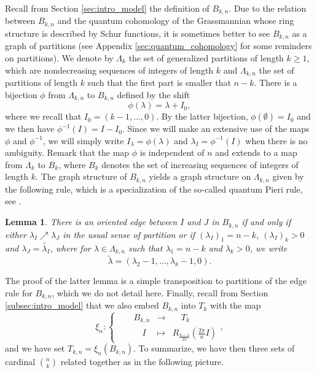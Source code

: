 \documentclass[10pt,11pt]{amsart}%
\newtheorem{lemma}[theorem]{Lemma}
\begin{document}
Recall from Section \ref{sec:intro_model} the definition of $B_{k,n}$. Due to the relation between $B_{k,n}$ and the quantum cohomology of the Grassmannian whose ring structure is described by Schur functions, it is sometimes better to see $B_{k,n}$ as a graph of partitions (see Appendix \ref{sec:quantum_cohomology} for some reminders on partitions). We denote by $\Lambda_{k}$ the set of generalized partitions of length $k\geq 1$, which are nondecreasing sequences of integers of length $k$ and $\Lambda_{k,n}$ the set of partitions of length $k$ such that the first part is smaller that $n-k$. There is a bijection $\phi$ from $\Lambda_{k,n}$ to $B_{k,n}$ defined by the shift
$$\phi(\lambda)=\lambda+I_0,$$
where we recall that $I_0=(k-1,\ldots,0)$. By the latter bijection, $\phi(\emptyset)=I_0$ and we then have $\phi^{-1}(I)=I-I_0$. Since we will make an extensive use of the maps $\phi$ and $\phi^{-1}$, we will simply write $I_{\lambda}=\phi(\lambda)$ and $\lambda_{I}=\phi^{-1}(I)$ when there is no ambiguity. Remark that the map $\phi$ is independent of $n$ and extends to a map from $\Lambda_{k}$ to $B_{k}$, where $B_{k}$ denotes the set of increasing sequences of integers of length $k$. The graph structure of $B_{k,n}$ yields a graph structure on $\Lambda_{k,n}$ given by the following rule, which is a specialization of the so-called quantum Pieri rule, see \cite{B}.
\begin{lemma}\label{lem:equivalence_graph_pieri}
There is an oriented edge between $I$ and $J$ in $B_{k,n}$ if and only if either $\lambda_{I}\nearrow \lambda_{J}$ in the usual sense of partition or if $(\lambda_{I})_1=n-k$, $(\lambda_{I})_{k}>0$ and $\lambda_{J}=\widetilde{\lambda_{I}}$, where for $\lambda\in \Lambda_{k,n}$ such that $\lambda_1=n-k$ and $\lambda_k>0$, we write 
$$\tilde{\lambda}=(\lambda_2-1,\ldots,\lambda_k-1,0).$$
\end{lemma}
The proof of the latter lemma is a simple transposition to partitions of the edge rule for $B_{k,n}$, which we do not detail here. Finally, recall from Section \ref{subsec:intro_model} that we also embed $B_{k,n}$ into $ T_{k}$ with the map
$$\xi_n:\left\lbrace \begin{aligned}
&\quad B_{k,n}&\rightarrow &\quad T_{k}\\
& \quad \quad I&\mapsto& R_{\frac{k-1}{2n}} \left(\frac{2\pi}{n}I\right)
\end{aligned}\right.,$$
and we have set $T_{k,n}=\xi_{n}(B_{k,n})$. To summarize, we have then three sets of cardinal $\binom nk$ related together as in the following picture.
\begin{center}
\end{center}
\end{document}
